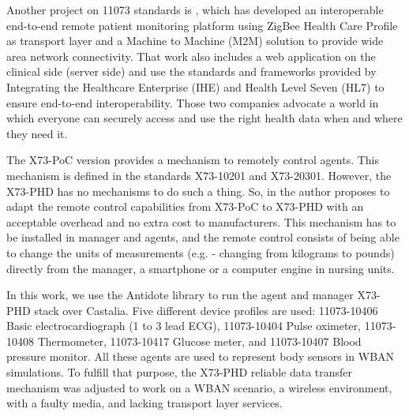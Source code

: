 Another project on 11073 standards is \cite{b11}, which has developed an interoperable end-to-end remote patient monitoring platform using ZigBee Health Care Profile as transport layer and a Machine to Machine (M2M) solution to provide wide area network connectivity. That work also includes a web application on the clinical side (server side) and use the standards and frameworks provided by Integrating the Healthcare Enterprise (IHE) \cite{b13} and Health Level Seven (HL7) \cite{b12} to ensure end-to-end interoperability. Those two companies advocate a world in which everyone can securely access and use the right health data when and where they need it.

The X73-PoC version provides a mechanism to remotely control agents. This mechanism is defined in the standards X73-10201 and X73-20301. However, the X73-PHD has no mechanisms to do such a thing. So, in \cite{b14} the author proposes to adapt the remote control capabilities from X73-PoC to X73-PHD with an acceptable overhead and no extra cost to manufacturers. This mechanism has to be installed in manager and agents, and the remote control consists of being able to change the units of measurements (e.g. - changing from kilograms to pounds) directly from the manager, a smartphone or a computer engine in nursing units.

In this work, we use the Antidote library to run the agent and manager X73-PHD stack over Castalia. Five different device profiles are used: 11073-10406 Basic electrocardiograph (1 to 3 lead ECG), 11073-10404 Pulse oximeter, 11073-10408 Thermometer, 11073-10417 Glucose meter, and 11073-10407 Blood pressure monitor. All these agents are used to represent body sensors in WBAN simulations. To fulfill that purpose, the X73-PHD reliable data transfer mechanism was adjusted to work on a WBAN scenario, a wireless environment, with a faulty media, and lacking transport layer services.

